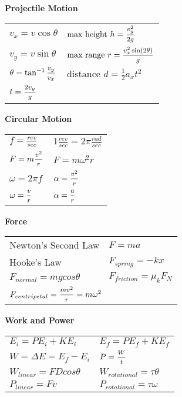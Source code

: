 \documentclass[12pt]{article}
\begin{document}
%
%
\begin{minipage}[t]{.5\textwidth}
\textbf{Projectile Motion} \\[6pt]
	\begin{tabular}{p{3cm} p{6cm}}
	$v_x = v \cos \theta$ & $\text{max height   } h = \mfrac{v_{y}^2}{2g}$ \\[6pt]
	$v_y = v \sin \theta$ & $\text{max range   } r = \mfrac{v_{x}^2 \sin(2\theta)}{g}$ \\[6pt]
		
	$\theta = \tan ^{-1} \mfrac{v_y}{v_x}$ & $\text{distance    } d = \tfrac{1}{2} a_x t^2$ \\[6pt]
	$t = \mfrac{2v_{y}}{g}$ & \\[6pt]
	\end{tabular}

\end{minipage}\vspace{12pt}
%
%
\begin{minipage}[t]{.5\textwidth}
\textbf{Circular Motion} \\[6pt]
\begin{tabular}{p{4cm} p{6cm}}
	$f = \frac{rev}{sec}$ & $1 \frac{rev}{sec} = 2\pi \frac{rad}{sec}$ \\[6pt]
	$F = m \mfrac{v^2}{r}$ & $F = m \omega^2 r$ \\[6pt]
	$\omega = 2\pi f$ & $\alpha = \mfrac{v^2}{r}$ \\[6pt]
	$\omega = \mfrac{v}{r}$ & $ \alpha = \mfrac{a}{r}$ \\[12pt]
\end{tabular}	
\end{minipage}

%
%
\begin{minipage}[t]{.5\textwidth}
\textbf{Force} \\[6pt]
\begin{tabular}{p{4cm} p{6cm}}
	\small{Newton's Second Law} & $F = ma$ \\[6pt]
	\small{Hooke's Law} & $F_{spring} = -kx$ \\[6pt]
	$F_{normal} = mgcos\theta$ & $F_{friction} = \mu_k F_N$ \\[6pt]
	\multicolumn{2}{l}{	$F_{centripetal} = \mfrac{mv^2}{r} = m\omega^2$} \\[12pt]
\end{tabular}	
\end{minipage}
%
%
\begin{minipage}[t]{.5\textwidth}
\textbf{Work and Power} \\[6pt]
\begin{tabular}{p{4cm} p{6cm}}
	$E_i = PE_i + KE_i$ & $E_f = PE_f + KE_f$ \\[6pt]
	$W = \Delta E = E_f - E_i$ & $P = \mfrac{W}{t}$ \\[6pt]
	$W_{linear} = FDcos\theta$ & $W_{rotational} = \tau \theta$  \\[6pt]
	$P_{linear} = Fv$ & $P_{rotational} = \tau \omega$ \\[6pt]
\end{tabular}	
\end{minipage}
\vspace{12pt}
\end{document}
